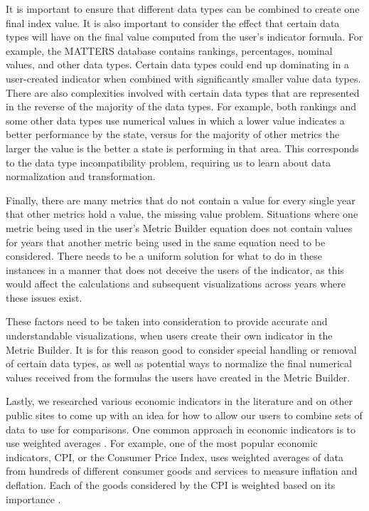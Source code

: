 		It is important to ensure that different data types can be combined to 
		create one final index value. It is also important to consider the 
		effect that certain data types will have on the final value computed 
		from the user's indicator formula. For example, the MATTERS database 
		contains rankings, percentages, nominal values, and other data types. 
		Certain data types could end up dominating in a user-created indicator 
		when combined with significantly smaller value data types. There are 
		also complexities involved with certain data types that are represented 
		in the reverse of the majority of the data types. For example, both 
		rankings and some other data types use numerical values in which a lower 
		value indicates a better performance by the state, versus for the 
		majority of other metrics the larger the value is the better a state is 
		performing in that area. This corresponds to the data type 
		incompatibility problem, requiring us to learn about data normalization 
		and transformation. 

		Finally, there are many metrics that do not contain a value for every 
		single year that other metrics hold a value, the missing value problem. 
		Situations where one metric being used in the user's Metric Builder 
		equation does not contain values for years that another metric being 
		used in the same equation need to be considered. There needs to be a 
		uniform solution for what to do in these instances in a manner that does 
		not deceive the users of the indicator, as this would affect the 
		calculations and subsequent visualizations across years where these 
		issues exist.

		These factors need to be taken into consideration to provide accurate 
		and understandable visualizations, when users create their own indicator 
		in the Metric Builder. It is for this reason good to consider special 
		handling or removal of certain data types, as well as potential ways to 
		normalize the final numerical values received from the formulas the 
		users have created in the Metric Builder.

		Lastly, we researched various economic indicators in the literature and 
		on other public sites to come up with an idea for how to allow our users 
		to combine sets of data to use for comparisons. One common approach in 
		economic indicators is to use weighted averages \cite{weightedaverage}. 
		For example, one of the most popular economic indicators, CPI, or the 
		Consumer Price Index, uses weighted averages of data from hundreds of 
		different consumer goods and services to measure inflation and 
		deflation. Each of the goods considered by the CPI is weighted based on 
		its importance \cite{cpi}.


